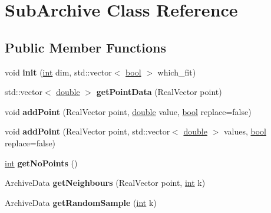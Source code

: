 \hypertarget{classSubArchive}{}\section{Sub\+Archive Class Reference}
\label{classSubArchive}
\subsection*{Public Member Functions}
\begin{DoxyCompactItemize}
\item 
void {\bfseries init} (\hyperlink{classint}{int} dim, std\+::vector$<$ \hyperlink{classbool}{bool} $>$ which\+\_\+fit)\hypertarget{classSubArchive_a73c9b8e7cc4c9e886fb1438f60d69e16}{}\label{classSubArchive_a73c9b8e7cc4c9e886fb1438f60d69e16}

\item 
std\+::vector$<$ \hyperlink{classdouble}{double} $>$ {\bfseries get\+Point\+Data} (Real\+Vector point)\hypertarget{classSubArchive_ad8b942f90bd0f2e693182ebf6ffa360e}{}\label{classSubArchive_ad8b942f90bd0f2e693182ebf6ffa360e}

\item 
void {\bfseries add\+Point} (Real\+Vector point, \hyperlink{classdouble}{double} value, \hyperlink{classbool}{bool} replace=false)\hypertarget{classSubArchive_a9df42194be60c9c7186f4049afa37204}{}\label{classSubArchive_a9df42194be60c9c7186f4049afa37204}

\item 
void {\bfseries add\+Point} (Real\+Vector point, std\+::vector$<$ \hyperlink{classdouble}{double} $>$ values, \hyperlink{classbool}{bool} replace=false)\hypertarget{classSubArchive_a8abb28b8c8de297646e505a0942964eb}{}\label{classSubArchive_a8abb28b8c8de297646e505a0942964eb}

\item 
\hyperlink{classint}{int} {\bfseries get\+No\+Points} ()\hypertarget{classSubArchive_abb5d4f04e9dd2447fb34f5d44074d015}{}\label{classSubArchive_abb5d4f04e9dd2447fb34f5d44074d015}

\item 
Archive\+Data {\bfseries get\+Neighbours} (Real\+Vector point, \hyperlink{classint}{int} k)\hypertarget{classSubArchive_a575fcee95e290381bc233ae9662efcfc}{}\label{classSubArchive_a575fcee95e290381bc233ae9662efcfc}

\item 
Archive\+Data {\bfseries get\+Random\+Sample} (\hyperlink{classint}{int} k)\hypertarget{classSubArchive_a8ede65eaa991dd2bedeb3829cb2e825c}{}\label{classSubArchive_a8ede65eaa991dd2bedeb3829cb2e825c}


\end{DoxyCompactItemize}
